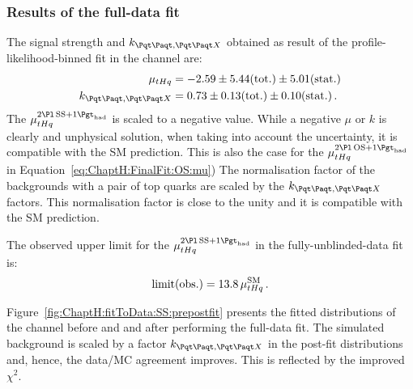 \FloatBarrier
\subsubsection{Results of the \dilepSStau full-data fit}
\label{sec:ChaptH:Fit:FullFit:SS:results}
The signal strength and $k_{\ttbar,\ttX}$ obtained as result of the profile-likelihood-binned fit in the \dilepSStau channel are:
\begin{align}
	\mu_{\tHq}		&= -2.59 \pm 5.44 (\text{tot.}) \pm 5.01 (\text{stat.})	\label{eq:ChaptH:FinalFit:SS:mu} \\
	k_{\ttbar,\ttX}		&= 0.73 \pm 0.13 (\text{tot.}) \pm 0.10 (\text{stat.}) 	\label{eq:ChaptH:FinalFit:SS:ktt} \, .
\end{align}
The $\mu^{\dilepSStau}_{\tHq}$ is scaled to a negative value. While a negative $\mu$ or $k$
is clearly and unphysical solution, when taking into account the uncertainty, it is compatible with 
the SM prediction. This is also the case for the  $\mu^{\dilepOStau}_{\tHq}$ in Equation~\ref{eq:ChaptH:FinalFit:OS:mu})
The normalisation factor of the backgrounds with a pair of top quarks 
are scaled by the $k_{\ttbar,\ttX}$ factors. This normalisation factor is
close to the unity and it is compatible with the SM prediction.



The observed upper limit for the $\mu^{\dilepSStau}_{\tHq}$ in the fully-unblinded-data fit is:
\begin{equation*}
	\text{limit(obs.)} = 13.8 \,\mu^{\text{SM}}_{tHq} \, . 
\end{equation*}

Figure~\ref{fig:ChaptH:fitToData:SS:prepostfit} presents the fitted distributions of the \dilepSStau channel before and 
and after performing the full-data fit. The simulated background is scaled by a factor $k_{\ttbar,\ttX}$ in the post-fit 
distributions and, hence, the data/MC agreement improves. This is reflected by the improved $\chi^{2}$.

